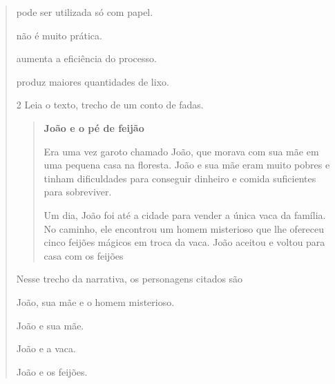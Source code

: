 \begin{quote}
\begin{escolha}
\item pode ser utilizada só com papel.

\item não é muito prática.

\item aumenta a eficiência do processo.

\item produz maiores quantidades de lixo.
\end{escolha}


\num{2} Leia o texto, trecho de um conto de fadas.

\begin{quote}
\textbf{João e o pé de feijão}

Era uma vez garoto chamado João, que morava com sua mãe em uma pequena
casa na floresta. João e sua mãe eram muito pobres e tinham dificuldades
para conseguir dinheiro e comida suficientes para sobreviver.

Um dia, João foi até a cidade para vender a única vaca da família. No
caminho, ele encontrou um homem misterioso que lhe ofereceu cinco
feijões mágicos em troca da vaca. João aceitou e voltou para casa com os
feijões
\end{quote}

Nesse trecho da narrativa, os personagens citados são

\begin{escolha}
\item João, sua mãe e o homem misterioso.

\item João e sua mãe.

\item João e a vaca.

\item João e os feijões.
\end{escolha}

\end{quote}
